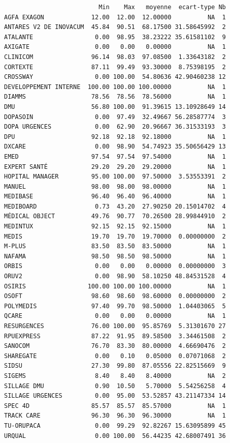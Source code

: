 \documentclass[]{article}
\begin{document}
\begin{verbatim}
                          Min    Max   moyenne  ecart-type Nb
AGFA EXAGON             12.00  12.00  12.00000          NA  1
ANTARES V2 DE INOVACUM  45.84  90.51  68.17500 31.58645992  2
ATALANTE                 0.00  98.95  38.23222 35.61581102  9
AXIGATE                  0.00   0.00   0.00000          NA  1
CLINICOM                96.14  98.03  97.08500  1.33643182  2
CORTEXTE                87.11  99.49  93.30000  8.75398195  2
CROSSWAY                 0.00 100.00  54.80636 42.90460238 12
DEVELOPPEMENT INTERNE  100.00 100.00 100.00000          NA  1
DIAMMS                  78.56  78.56  78.56000          NA  1
DMU                     56.80 100.00  91.39615 13.10928649 14
DOPASOIN                 0.00  97.49  32.49667 56.28587774  3
DOPA URGENCES            0.00  62.90  20.96667 36.31533193  3
DPU                     92.18  92.18  92.18000          NA  1
DXCARE                   0.00  98.90  54.74923 35.50656429 13
EMED                    97.54  97.54  97.54000          NA  1
EXPERT SANTÉ            29.20  29.20  29.20000          NA  1
HOPITAL MANAGER         95.00 100.00  97.50000  3.53553391  2
MANUEL                  98.00  98.00  98.00000          NA  1
MEDIBASE                96.40  96.40  96.40000          NA  1
MEDIBOARD                0.73  43.20  27.90250 20.15014702  4
MÉDICAL OBJECT          49.76  90.77  70.26500 28.99844910  2
MEDINTUX                92.15  92.15  92.15000          NA  1
MEDIS                   19.70  19.70  19.70000  0.00000000  2
M-PLUS                  83.50  83.50  83.50000          NA  1
NAFAMA                  98.50  98.50  98.50000          NA  1
ORBIS                    0.00   0.00   0.00000  0.00000000  3
ORUV2                    0.00  98.90  58.10250 48.84531528  4
OSIRIS                 100.00 100.00 100.00000          NA  1
OSOFT                   98.60  98.60  98.60000  0.00000000  2
POLYMEDIS               97.40  99.70  98.50000  1.04403065  5
QCARE                    0.00   0.00   0.00000          NA  1
RESURGENCES             76.00 100.00  95.85769  5.31301670 27
RPUEXPRESS              87.22  91.95  89.58500  3.34461508  2
SANOCOM                 76.70  83.30  80.00000  4.66690476  2
SHAREGATE                0.00   0.10   0.05000  0.07071068  2
SIDSU                   27.30  99.80  87.05556 22.82515669  9
SIGEMS                   8.40   8.40   8.40000          NA  2
SILLAGE DMU              0.90  10.50   5.70000  5.54256258  4
SILLAGE URGENCES         0.00  95.00  53.52857 43.21147334 14
SPEC 4D                 85.57  85.57  85.57000          NA  1
TRACK CARE              96.30  96.30  96.30000          NA  1
TU-ORUPACA               0.00  99.29  92.82267 15.63095899 45
URQUAL                   0.00 100.00  56.44235 42.68007491 36
\end{verbatim}
\end{document}

